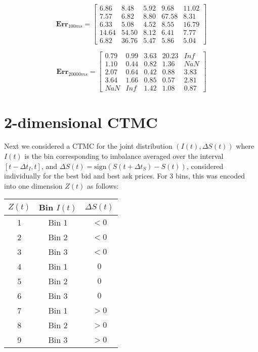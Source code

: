 \documentclass[12pt]{article}
\newcommand\mat[1]{\boldsymbol{#1}}
\begin{document}
$$\mat{Err}_{100ms} = \begin{bmatrix}
    6.86 &   8.48 &   5.92 &   9.68 &  11.02\\
    7.57 &   6.82 &   8.80 &  67.58 &   8.31\\
    6.33 &   5.08 &   4.52 &   8.55 &  16.79\\
   14.64 &  54.50 &   8.12 &   6.41 &   7.77\\
    6.82 &  36.76 &   5.47 &   5.86 &   5.04
\end{bmatrix}$$

$$\mat{Err}_{20000ms} = \begin{bmatrix}
    0.79 &   0.99 &   3.63 &  20.23 &    Inf\\
    1.10 &   0.44 &   0.82 &   1.36 &    NaN\\
    2.07 &   0.64 &   0.42 &   0.88 &   3.83\\
    3.64 &   1.66 &   0.85 &   0.57 &   2.81\\
     NaN &    Inf &   1.42 &   1.08 &   0.87
\end{bmatrix}$$

\section*{2-dimensional CTMC}
Next we considered a CTMC for the joint distribution $(I(t), \Delta S(t))$ where $I(t)$ is the bin corresponding to imbalance averaged over the interval $[t-\Delta t_I, t]$, and $\Delta S(t) = \text{sign}(S(t+\Delta t_S)-S(t))$, considered individually for the best bid and best ask prices. For 3 bins, this was encoded into one dimension $Z(t)$ as follows:

\begin{table}[H]
\small
\centering
\vspace*{2.5mm}
\begin{tabular}{c|c|c}
\hline
$Z(t)$ & Bin $I(t)$ & $\Delta S(t)$ \\
\hline\hline
1 & Bin 1 & $<0$ \\
\hline
2 & Bin 2 & $<0$ \\
\hline
3 & Bin 3 & $<0$ \\
\hline
4 & Bin 1 & $0$ \\
\hline
5 & Bin 2 & $0$ \\
\hline
6 & Bin 3 & $0$ \\
\hline
7 & Bin 1 & $>0$ \\
\hline
8 & Bin 2 & $>0$ \\
\hline
9 & Bin 3 & $>0$ \\
\hline
\end{tabular}
\end{table}
\end{document}
